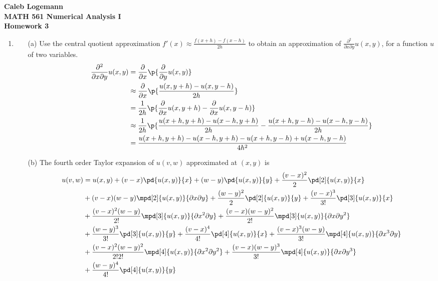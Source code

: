 \documentclass[11pt]{article}
\begin{document}
\noindent \textbf{\Large{Caleb Logemann \\
MATH 561 Numerical Analysis I \\
Homework 3
}}

\begin{enumerate}
    \item %
    \begin{enumerate}
        \item[(a)] Use the central quotient approximation $f'(x) \approx
            \frac{f(x + h) - f(x - h)}{2h}$ to obtain an approximation of
            $\frac{\partial^2}{\partial x \partial y} u(x,y)$, for a function
            $u$ of two variables.
            \begin{align*}
                \frac{\partial^2}{\partial x \partial y} u(x,y) &=
                    \frac{\partial}{\partial x} \p{\frac{\partial}{\partial y} u(x,y)} \\
                &\approx \frac{\partial}{\partial x} \p{\frac{u(x,y + h) - u(x,y - h)}{2h}} \\
                &= \frac{1}{2h} \p{\frac{\partial}{\partial x} u(x,y+h) -
                    \frac{\partial}{\partial x} u(x,y-h)} \\
                &\approx \frac{1}{2h} \p{\frac{u(x+h, y+h) - u(x-h, y+h)}{2h} -
                    \frac{u(x+h, y-h) - u(x-h, y-h)}{2h}} \\
                &= \frac{u(x+h, y+h) - u(x-h, y+h) - u(x+h, y-h) + u(x-h, y-h)}{4h^2} \\
            \end{align*}

        \item[(b)]
            The fourth order Taylor expansion of $u(v,w)$ approximated at $(x,y)$ is
            \begin{align*}
                u(v,w) &= u(x,y) + (v - x)\pd{u(x,y)}{x} + (w - y)\pd{u(x,y)}{y}
                + \frac{(v-x)^2}{2} \pd[2]{u(x,y)}{x} \\
                &+ (v-x)(w-y)\mpd[2]{u(x,y)}{\partial x \partial y}
                + \frac{(w-y)^2}{2}\pd[2]{u(x,y)}{y}
                + \frac{(v-x)^3}{3!}\pd[3]{u(x,y)}{x} \\
                &+ \frac{(v-x)^2(w-y)}{2!} \mpd[3]{u(x,y)}{\partial x^2 \partial y}
                + \frac{(v-x)(w-y)^2}{2!} \mpd[3]{u(x,y)}{\partial x \partial y^2} \\
                &+ \frac{(w-y)^3}{3!} \pd[3]{u(x,y)}{y}
                + \frac{(v-x)^4}{4!} \pd[4]{u(x,y)}{x}
                + \frac{(v-x)^3(w-y)}{3!} \mpd[4]{u(x,y)}{\partial x^3 \partial y} \\
                &+ \frac{(v-x)^2 (w-y)^2}{2! 2!} \mpd[4]{u(x,y)}{\partial x^2 \partial y^2}
                + \frac{(v-x) (w-y)^3}{3!} \mpd[4]{u(x,y)}{\partial x \partial y^3} \\
                &+ \frac{(w-y)^4}{4!} \pd[4]{u(x,y)}{y}
            \end{align*}


\end{enumerate}
\end{enumerate}
\end{document}
